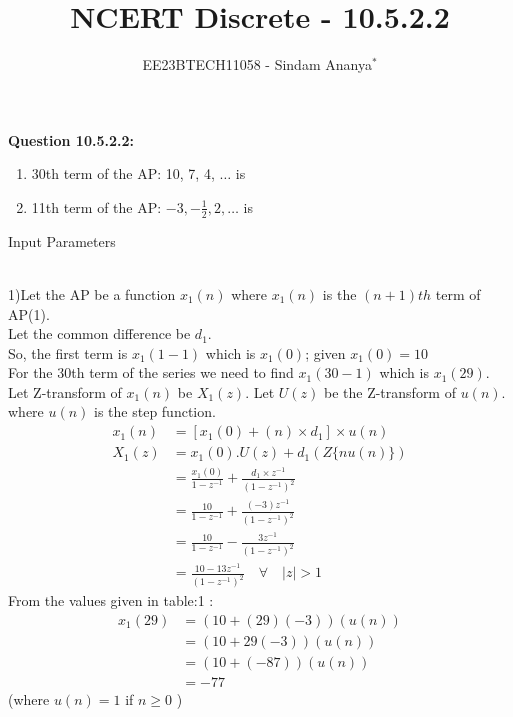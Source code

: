 \documentclass[journal,12pt,twocolumn]{IEEEtran}
\theoremstyle{remark}
\begin{document}

\vspace{3cm}

\title{NCERT Discrete - 10.5.2.2}
\author{EE23BTECH11058 - Sindam Ananya$^{*}$%
}
\maketitle
\newpage
\bigskip

\renewcommand{\thefigure}{\theenumi}
\renewcommand{\thetable}{\theenumi}

\vspace{3cm}
\textbf{Question 10.5.2.2:} 
\begin{enumerate}
\item 30th term of the AP: 10, 7, 4, $\ldots$ is 
\item 11th term of the AP: $-3, -\frac{1}{2}, 2, \ldots$ is
\end{enumerate}
\solution
\begin{table}[h!]
    \centering
    
    \caption{Input Parameters}
    \label{table:1}
    \end{table}\\
1)Let the AP be a function $x_1(n)$ where $x_1(n)$ is the $(n+1)th$ term of AP(1).\\
Let the common difference be $d_1$.\\
So, the first term is $x_1(1-1)$ which is $x_1(0)$; given $x_1(0) = 10$\\ 
For the 30th term of the series we need to find $x_1(30-1)$ which is $x_1(29)$.\\
Let Z-transform of $x_1(n)$ be $X_1(z)$. Let $U(z)$ be the Z-transform of $u(n)$.\\
where \(u(n)\) is the step function.
\begin{align}
x_1(n) &= [x_1(0) + (n) \times d_1 ]\times u(n)\\
X_1(z) &= x_1(0).U(z) + d_1(Z\{nu(n)\})\\
       &= \frac{x_1(0)}{1-z^{-1}} + \frac{d_1\times z^{-1}}{(1-z^{-1})^2}\\
       &= \frac{10}{1-z^{-1}} + \frac{(-3)z^{-1}}{(1-z^{-1})^2}\\
       &= \frac{10}{1-z^{-1}} - \frac{3z^{-1}}{(1-z^{-1})^2}\\
       &= \frac{10 - 13z^{-1}}{(1-z^{-1})^2} \quad \forall \quad |z| > 1
\end{align}
From the values given in table:1 :
\begin{align}
x_1(29) &= (10 + (29)(-3))(u(n))\\
&= (10 + 29(-3))(u(n))\\
&= (10+ (-87))(u(n))  \\
&= -77
\end{align}
(where $u(n) = 1$ if $n \geq 0$ )\\
                 
\end{document}
